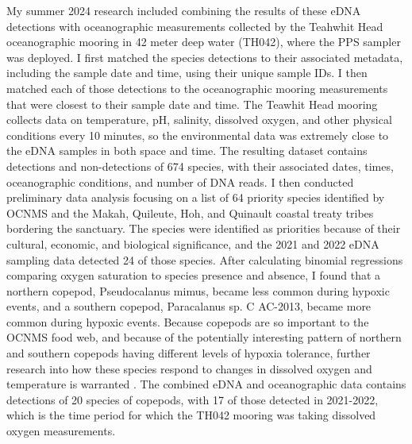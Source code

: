 \documentclass[12pt,twoside]{reedthesis}
\begin{document}
My summer 2024 research included combining the results of these eDNA detections with oceanographic measurements collected by the Teahwhit Head oceanographic mooring in 42 meter deep water (TH042), where the PPS sampler was deployed. I first matched the species detections to their associated metadata, including the sample date and time, using their unique sample IDs. I then matched each of those detections to the oceanographic mooring measurements that were closest to their sample date and time. The Teawhit Head mooring collects data on temperature, pH, salinity, dissolved oxygen, and other physical conditions every 10 minutes, so the environmental data was extremely close to the eDNA samples in both space and time. The resulting dataset contains detections and non-detections of 674 species, with their associated dates, times, oceanographic conditions, and number of DNA reads. I then conducted preliminary data analysis focusing on a list of 64 priority species identified by OCNMS and the Makah, Quileute, Hoh, and Quinault coastal treaty tribes bordering the sanctuary. The species were identified as priorities because of their cultural, economic, and biological significance, and the 2021 and 2022 eDNA sampling data detected 24 of those species. After calculating binomial regressions comparing oxygen saturation to species presence and absence, I found that a northern copepod, Pseudocalanus mimus, became less common during hypoxic events, and a southern copepod, Paracalanus sp. C AC-2013, became more common during hypoxic events. Because copepods are so important to the OCNMS food web, and because of the potentially interesting pattern of northern and southern copepods having different levels of hypoxia tolerance, further research into how these species respond to changes in dissolved oxygen and temperature is warranted \autocite{Fisheries2024}. The combined eDNA and oceanographic data contains detections of 20 species of copepods, with 17 of those detected in 2021-2022, which is the time period for which the TH042 mooring was taking dissolved oxygen measurements.
\end{document}
